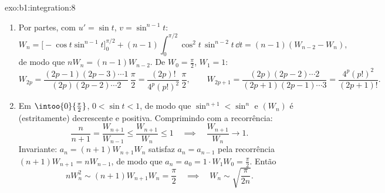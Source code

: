 \begin{solution}{exo:b1:integration:8}
\begin{enumerate}
  \item Por partes, com $u' = \sin t$, $v = \sin^{n-1} t$:
        \[
        W_n = \bigl[-\cos t\sin^{n-1}t\bigr]_0^{\pi/2}
        + (n-1)\int_0^{\pi/2} \cos^2 t\,\sin^{n-2} t\,\dd t
        = (n-1)(W_{n-2} - W_n),
        \]
        de modo que $nW_n = (n-1)W_{n-2}$. De $W_0 = \frac\pi2$, $W_1 = 1$:
        \[
        W_{2p} = \frac{(2p-1)(2p-3)\cdots 1}{(2p)(2p-2)\cdots 2}\,
        \frac{\pi}{2} = \frac{(2p)!}{4^p (p!)^2}\,\frac\pi2,
        \qquad
        W_{2p+1} = \frac{(2p)(2p-2)\cdots 2}{(2p+1)(2p-1)\cdots 3}
        = \frac{4^p (p!)^2}{(2p+1)!} .
        \]
  \item Em $\intoo{0}{\frac\pi2}$, $0 < \sin t < 1$, de modo que $\sin^{n+1} <
        \sin^n$ e $(W_n)$ é (estritamente) decrescente e positiva.
        Comprimindo com a recorrência:
        \[
        \frac{n}{n+1} = \frac{W_{n+1}}{W_{n-1}}
        \leq \frac{W_{n+1}}{W_n} \leq 1
        \quad\implies\quad \frac{W_{n+1}}{W_n} \to 1 .
        \]
        Invariante: $a_n = (n+1)W_{n+1}W_n$ satisfaz $a_n = a_{n-1}$
        pela recorrência $(n+1)W_{n+1} = nW_{n-1}$, de modo que $a_n = a_0 =
        1 \cdot W_1 W_0 = \frac\pi2$. Então
        \[
        n W_n^2 \sim (n+1) W_{n+1} W_n = \frac\pi2
        \quad\implies\quad
        W_n \sim \sqrt{\frac{\pi}{2n}} .
        \]
\end{enumerate}
\end{solution}

